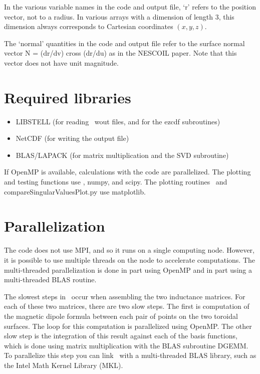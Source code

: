 In the various variable names in the code and output file, `r' refers
to the position vector, not to a radius.  In various arrays with a
dimension of length 3, this dimension always corresponds to Cartesian
coordinates $(x,y,z)$.

The `normal' quantities in the code and output file refer to the
surface normal vector N = (dr/dv) cross (dr/du) as in the NESCOIL
paper. Note that this vector does not have unit magnitude.



\section{Required libraries}

\begin{itemize}

\item {\ttfamily LIBSTELL} (for reading \vmec~{\ttfamily wout} files, and for the {\ttfamily ezcdf} subroutines)
\item {\ttfamily NetCDF} (for writing the output file)
\item {\ttfamily BLAS/LAPACK} (for matrix multiplication and the SVD subroutine)

\end{itemize}

If {\ttfamily OpenMP} is available, calculations with the code are parallelized.  The plotting and testing functions use \python,
{\ttfamily numpy}, and {\ttfamily scipy}.
The plotting routines \bdistribPlot~and {\ttfamily compareSingularValuesPlot.py} use {\ttfamily matplotlib}.

\section{Parallelization}

The code does not use {\ttfamily MPI}, and so it runs on a single computing node.  However, it is possible to use multiple threads
on the node to accelerate computations.  The multi-threaded parallelization is done in part using {\ttfamily OpenMP}
and in part using a multi-threaded {\ttfamily BLAS} routine.

The slowest steps in \bdistrib~occur when assembling the two
inductance matrices.  For each of these two matrices, there are two slow steps.
The first is computation of the magnetic dipole formula between each pair of points
on the two toroidal surfaces.  The loop for this computation is parallelized using {\ttfamily OpenMP}.
The other slow step is the integration of this result against each of the basis functions,
which is done using matrix multiplication with the {\ttfamily BLAS} subroutine {\ttfamily DGEMM}.
To parallelize this step you can link \bdistrib~with a multi-threaded  {\ttfamily BLAS} library,
such as the Intel Math Kernel Library (MKL).

